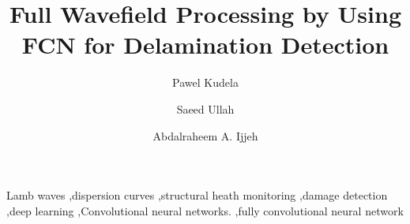 \documentclass[preprint,10pt]{elsarticle}
\begin{document}
	\begin{frontmatter}
		
		\title{Full Wavefield Processing by Using FCN for Delamination Detection}
		
		\address[IFFM]{Institute of Fluid Flow Machinery, Polish Academy of Sciences, Poland}
		
		\author{Pawel Kudela}
		\author{Saeed Ullah }
		\author{Abdalraheem A. Ijjeh}
		
		
		\begin{abstract}
		
		\end{abstract}
		
		\begin{keyword}
			Lamb waves \sep dispersion curves \sep structural heath monitoring \sep damage detection \sep deep learning \sep Convolutional neural networks. \sep fully convolutional neural network
			
			
		\end{keyword}
		
	\end{frontmatter}
\end{document}
